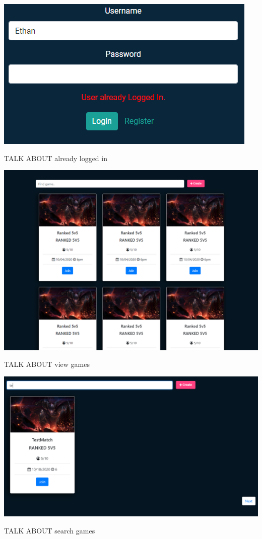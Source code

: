 \begin{center}    
	\includegraphics[width=\textwidth/2,height=\textheight,keepaspectratio]{img/LoggedIn.png}
\end{center}
TALK ABOUT already logged in

\begin{center}    
	\includegraphics[width=\textwidth,height=\textheight,keepaspectratio]{img/ViewGames.png}
\end{center}
TALK ABOUT view games

\begin{center}    
	\includegraphics[width=\textwidth,height=\textheight,keepaspectratio]{img/SearchGames.png}
\end{center}
TALK ABOUT search games

